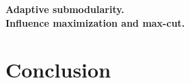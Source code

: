 \documentclass{article}
\renewcommand{\paragraph}[1]{\vspace{0.3em}\noindent\textbf{#1.}\makebox[0.5em]{}}
\begin{document}
\paragraph{Adaptive submodularity}\\
\paragraph{Influence maximization and max-cut}

\section{Conclusion}

\clearpage



\iftoggle{short}
{}
{
\clearpage
\onecolumn
\appendix
\setcounter{lemma}{0}
\setcounter{theorem}{0}

}
\end{document}
